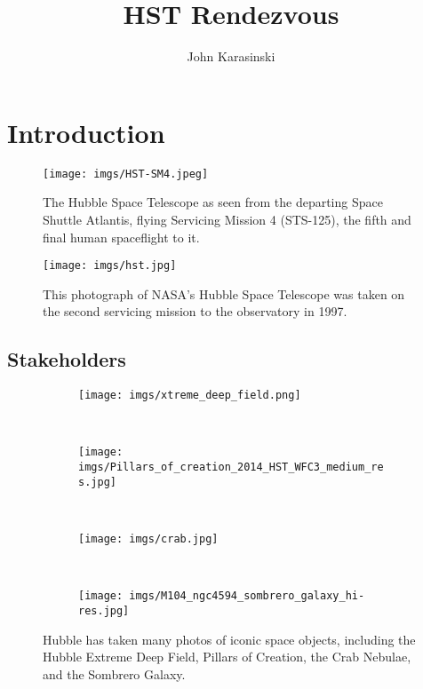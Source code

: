 \documentclass[onecolumn,10pt]{jhwhw}
\author{John Karasinski}
\title{HST Rendezvous}
\begin{document}

\chapter{Introduction}

\begin{figure}[h!]
\begin{center}
\texttt{[image: imgs/HST-SM4.jpeg]}
\caption{The Hubble Space Telescope as seen from the departing Space Shuttle Atlantis, flying Servicing Mission 4 (STS-125), the fifth and final human spaceflight to it.}
\label{fig:density}
\end{center}
\end{figure}

\begin{figure}[h!]
\begin{center}
\texttt{[image: imgs/hst.jpg]}
\caption{This photograph of NASA's Hubble Space Telescope was taken on the second servicing mission to the observatory in 1997.}
\label{fig:density}
\end{center}
\end{figure}


\section{Stakeholders}

\begin{figure}[t!]
    \centering
    \begin{subfigure}[b]{0.4\textwidth}
        \texttt{[image: imgs/xtreme\_deep\_field.png]}
    \end{subfigure}
    ~ %
     \begin{subfigure}[b]{0.4\textwidth}
        \texttt{[image: imgs/Pillars\_of\_creation\_2014\_HST\_WFC3\_medium\_res.jpg]}
    \end{subfigure}
    ~ %
    \begin{subfigure}[b]{0.4\textwidth}
        \texttt{[image: imgs/crab.jpg]}
    \end{subfigure}
    ~ %
    \begin{subfigure}[b]{0.4\textwidth}
        \texttt{[image: imgs/M104\_ngc4594\_sombrero\_galaxy\_hi-res.jpg]}
    \end{subfigure}
    \caption{Hubble has taken many photos of iconic space objects, including the Hubble Extreme Deep Field, Pillars of Creation, the Crab Nebulae, and the Sombrero Galaxy.}
    \label{fig:animals}
\end{figure}
\end{document}
